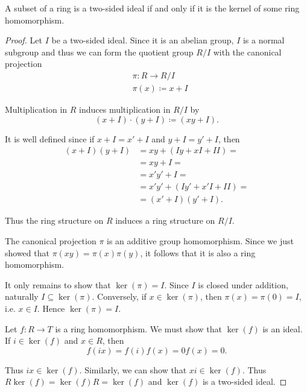 \begin{definition}\label{thm:semiring_ideal_iff_kernel}
  A subset of a ring is a two-sided ideal if and only if it is the kernel of some ring homomorphism.
\end{definition}
\begin{proof}
  \Implies Let \( I \) be a two-sided ideal. Since it is an abelian group, \( I \) is a normal subgroup and thus we can form the quotient group \( R / I \) with the canonical projection
  \begin{align*}
    &\pi: R \to R / I \\
    &\pi(x) \coloneqq x + I
  \end{align*}

  Multiplication in \( R \) induces multiplication in \( R / I \) by
  \begin{equation*}
    (x + I) \cdot (y + I) \coloneqq (xy + I).
  \end{equation*}

  It is well defined since if \( x + I = x' + I \) and \( y + I = y' + I \), then
  \begin{align*}
    (x + I) (y + I)
    &=
    xy + (Iy + xI + II)
    = \\ &=
    xy + I
    = \\ &=
    x'y' + I
    = \\ &=
    x'y' + (Iy' + x'I + II)
    = \\ &=
    (x' + I) (y' + I).
  \end{align*}

  Thus the ring structure on \( R \) induces a ring structure on \( R / I \).

  The canonical projection \( \pi \) is an additive group homomorphism. Since we just showed that \( \pi(xy) = \pi(x) \pi(y) \), it follows that it is also a ring homomorphism.

  It only remains to show that \( \ker(\pi) = I \). Since \( I \) is closed under addition, naturally \( I \subseteq \ker(\pi) \). Conversely, if \( x \in \ker(\pi) \), then \( \pi(x) = \pi(0) = I \), i.e. \( x \in I \). Hence \( \ker(\pi) = I \).

  \ImpliedBy Let \( f: R \to T \) is a ring homomorphism. We must show that \( \ker(f) \) is an ideal. If \( i \in \ker(f) \) and \( x \in R \), then
  \begin{equation*}
    f(ix) = f(i) f(x) = 0 f(x) = 0.
  \end{equation*}

  Thus \( ix \in \ker(f) \). Similarly, we can show that \( xi \in \ker(f) \). Thus \( R \ker(f) = \ker(f) R = \ker(f) \) and \( \ker(f) \) is a two-sided ideal.
\end{proof}

